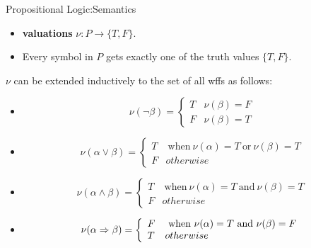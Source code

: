 \documentclass[xcolor=dvipsnames]{beamer}
\begin{document}
\begin{frame}{Propositional Logic:Semantics}
\begin{itemize}
\item {\bf valuations} $\nu:P \to \{T,F\}$. 
\item Every symbol in $P$ gets exactly one of the truth values $\{T,F\}$.
\end{itemize}
\pause
$\nu$ can be extended inductively to the set of all wffs as follows:
\begin{itemize}
\item \[ \nu(\lnot\beta)=\left\{ \begin{array}{ll}
                 T	& \nu(\beta)=F\\
                 F	& \nu(\beta)=T
                   
                \end{array}
                	\right. \]
 
\item \[ \nu(\alpha \lor \beta)=\left\{ \begin{array}{ll}
                 T	& ~\mbox{when}~ \nu(\alpha)=T ~\mbox{or}~ \nu(\beta)=T\\
                 F	& otherwise
                   
                \end{array}
                	\right. \]
 
\item \[ \nu(\alpha \land \beta)=\left\{ \begin{array}{ll}
                 T	& ~\mbox{when}~ \nu(\alpha)=T ~\mbox{and}~ \nu(\beta)=T\\
                 F	& otherwise
                   
                \end{array}
                	\right. \]

\item \[ \nu(\alpha \Rightarrow \beta)=\left\{ \begin{array}{ll}
                 F	& ~\mbox{when}~ \nu(\alpha)=T ~\mbox{and}~ \nu(\beta)=F\\
                 T	& otherwise
                   
                \end{array}
                	\right. \]

\end{itemize}

\end{frame}
\end{document}
